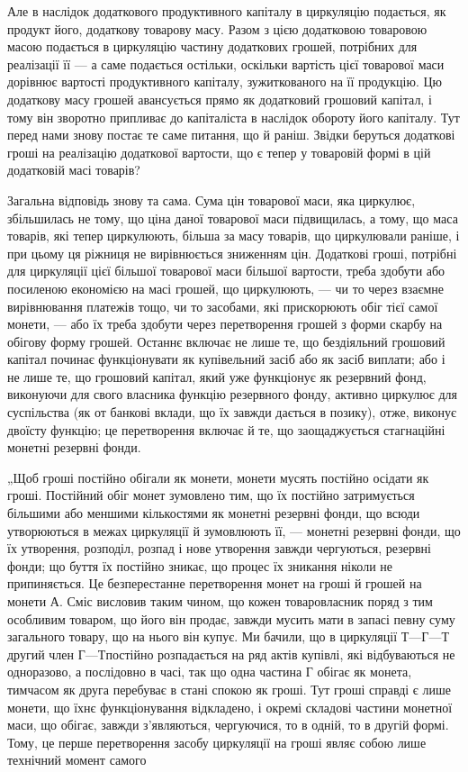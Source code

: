 Але в наслідок додаткового продуктивного капіталу в циркуляцію
подається, як продукт його, додаткову товарову масу. Разом з цією
додатковою товаровою масою подається в циркуляцію частину додаткових
грошей, потрібних для реалізації її — а саме подається остільки, оскільки
вартість цієї товарової маси дорівнює вартості продуктивного капіталу,
зужиткованого на її продукцію. Цю додаткову масу грошей авансується
прямо як додатковий грошовий капітал, і тому він зворотно припливає
до капіталіста в наслідок обороту його капіталу. Тут перед нами знову
постає те саме питання, що й раніш. Звідки беруться додаткові гроші на
реалізацію додаткової вартости, що є тепер у товаровій формі в цій
додатковій масі товарів?

Загальна відповідь знову та сама. Сума цін товарової маси, яка циркулює,
збільшилась не тому, що ціна даної товарової маси підвищилась,
а тому, що маса товарів, які тепер циркулюють, більша за масу товарів,
що циркулювали раніше, і при цьому ця ріжниця не вирівнюється зниженням
цін. Додаткові гроші, потрібні для циркуляції цієї більшої товарової
маси більшої вартости, треба здобути або посиленою економією на
масі грошей, що циркулюють, — чи то через взаємне вирівнювання платежів
тощо, чи то засобами, які прискорюють обіг тієї самої монети, —
або їх треба здобути через перетворення грошей з форми скарбу на
обігову форму грошей. Останнє включає не лише те, що бездіяльний
грошовий капітал починає функціонувати як купівельний засіб
або як засіб виплати; або і не лише те, що грошовий капітал, який уже
функціонує як резервний фонд, виконуючи для свого власника функцію
резервного фонду, активно циркулює для суспільства (як от банкові
вклади, що їх завжди дається в позику), отже, виконує двоїсту функцію;
це перетворення включає й те, що заощаджується стагнаційні монетні
резервні фонди.

„Щоб гроші постійно обігали як монети, монети мусять постійно
осідати як гроші. Постійний обіг монет зумовлено тим, що їх постійно
затримується більшими або меншими кількостями як монетні резервні
фонди, що всюди утворюються в межах циркуляції й зумовлюють її, —
монетні резервні фонди, що їх утворення, розподіл, розпад і нове утворення
завжди чергуються, резервні фонди; що буття їх постійно зникає,
що процес їх зникання ніколи не припиняється. Це безперестанне перетворення
монет на гроші й грошей на монети А. Сміс висловив таким
чином, що кожен товаровласник поряд з тим особливим товаром, що
його він продає, завжди мусить мати в запасі певну суму загального
товару, що на нього він купує. Ми бачили, що в циркуляції $Т — Г — Т$
другий член $Г — Т п$остійно розпадається на ряд актів купівлі, які відбуваються
не одноразово, а послідовно в часі, так що одна частина Г
обігає як монета, тимчасом як друга перебуває в стані спокою як гроші.
Тут гроші справді є лише монети, що їхнє функціонування відкладено,
і окремі складові частини монетної маси, що обігає, завжди з’являються,
чергуючися, то в одній, то в другій формі. Тому, це перше перетворення
засобу циркуляції на гроші являє собою лише технічний момент самого
\parbreak{}  %
